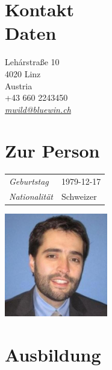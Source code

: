 \documentclass[line,11pt,a4paper]{../resume}
\newcommand{\mail}[1]{\textsl{\href{mailto:#1}{#1}}}
\begin{document}
\begin{resume}

\begin{multicols}{2}

\section{\mysidestyle Kontakt\\Daten}\vspace{2mm}

Leh\'{a}rstra{\ss}e 10 \\
4020 Linz \\
Austria \\
+43 660 2243450 \\
\mail{mwild@bluewin.ch}

\section{\mysidestyle Zur Person}\vspace{2mm}

\begin{tabular}{@{}ll}
\textsl{Geburtstag} & 1979-12-17 \\
\textsl{Nationalität}   & Schweizer
\end{tabular}

\columnbreak
\vspace*{-9mm}\hfill\includegraphics[width=45mm]{../mwild}

\end{multicols}

\section{\mysidestyle Ausbildung}\vspace{2mm}


\end{resume}
\end{document}
